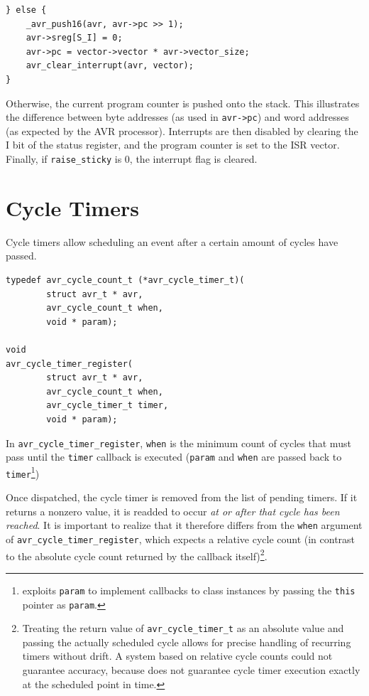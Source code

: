 \begin{lstlisting}
} else {
    _avr_push16(avr, avr->pc >> 1);
    avr->sreg[S_I] = 0;
    avr->pc = vector->vector * avr->vector_size;
    avr_clear_interrupt(avr, vector);
}
\end{lstlisting}

Otherwise, the current program counter is pushed onto the stack. This illustrates
the difference between byte addresses (as used in \lstinline|avr->pc|) and
word addresses (as expected by the \ac{AVR} processor).
Interrupts are then disabled by clearing the I bit of the status register, and
the program counter is set to the \ac{ISR} vector. Finally, if
\lstinline|raise_sticky| is 0, the interrupt flag is cleared.

\section{Cycle Timers} \label{section:cycle_timers}

Cycle timers allow scheduling an event after a certain amount of cycles have
passed.

\begin{lstlisting}
typedef avr_cycle_count_t (*avr_cycle_timer_t)(
        struct avr_t * avr,
        avr_cycle_count_t when,
        void * param);

void
avr_cycle_timer_register(
        struct avr_t * avr,
        avr_cycle_count_t when,
        avr_cycle_timer_t timer,
        void * param);
\end{lstlisting}

In \lstinline|avr_cycle_timer_register|,
\lstinline|when| is the minimum count of cycles that must pass until the
\lstinline|timer| callback is executed (\lstinline|param| and \lstinline|when|
are passed back to \lstinline|timer|\footnote{
\qsimavr exploits \lstinline|param| to implement
callbacks to class instances by passing the \lstinline|this| pointer as
\lstinline|param|.})

Once dispatched, the cycle timer is removed from the list of pending timers. If
it returns a nonzero value, it is readded to occur \emph{at or after that cycle has
been reached}. It is important to realize that it therefore differs from the
\lstinline|when| argument of \lstinline|avr_cycle_timer_register|, which expects
a relative cycle count (in contrast to the absolute cycle count returned by the
callback itself)\footnote{
%
Treating the return value of \lstinline|avr_cycle_timer_t| as an absolute value
and passing the actually scheduled cycle allows for precise handling of recurring
timers without drift. A system based on relative cycle counts could not guarantee
accuracy, because \simavr does not guarantee cycle timer execution exactly at the
scheduled point in time.
}.

